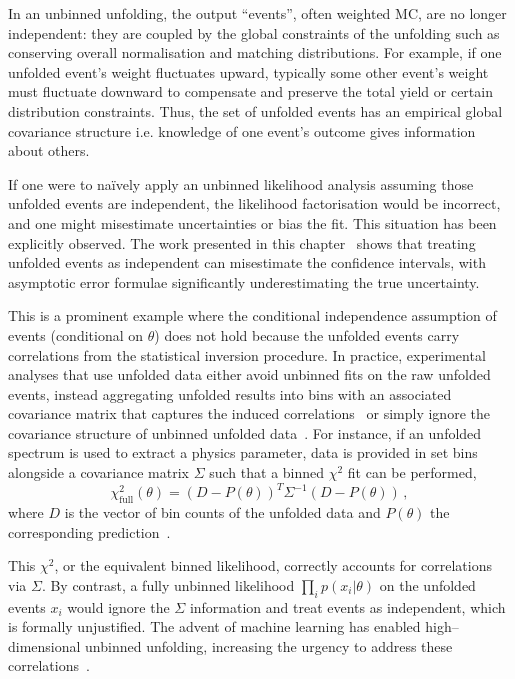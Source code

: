         In an unbinned unfolding, the output ``events'', often weighted MC, are no longer independent: they are coupled by the global constraints of the unfolding such as conserving overall normalisation and matching distributions.
        For example, if one unfolded event’s weight fluctuates upward, typically some other event’s weight must fluctuate downward to compensate and preserve the total yield or certain distribution constraints.
        Thus, the set of unfolded events has an empirical global covariance structure i.e. knowledge of one event's outcome gives information about others.
        
        If one were to naïvely apply an unbinned likelihood analysis assuming those unfolded events are independent, the likelihood factorisation would be incorrect, and one might misestimate uncertainties or bias the fit.
        This situation has been explicitly observed.
        The work presented in this chapter~\cite{Desai:2025mpy} shows that treating unfolded events as independent can misestimate the confidence intervals, with asymptotic error formulae significantly underestimating the true uncertainty.
        
        This is a prominent example where the conditional independence assumption of events (conditional on $\theta$) does not hold because the unfolded events carry correlations from the statistical inversion procedure.
        In practice, experimental analyses that use unfolded data either avoid unbinned fits on the raw unfolded events, instead aggregating unfolded results into bins with an associated covariance matrix that captures the induced correlations~\cite{Huang2025MachineTechnique} or simply ignore the covariance structure of unbinned unfolded data~\cite{Canelli:2025ybb, Arratia:2021otl}.
        For instance, if an unfolded spectrum is used to extract a physics parameter, data is provided in set bins alongside a covariance matrix $\Sigma$ such that a binned $\chi^2$ fit can be performed,
          \[
            \label{eq:chi2cov}
            \chi^2_{\text{full}}(\theta) = (D - P(\theta))^T \Sigma^{-1} (D - P(\theta))\,,
          \] 
        where $D$ is the vector of bin counts of the unfolded data and $P(\theta)$ the corresponding prediction~\cite{D0:2020ujb, CMS:2024onh, Gribanov:2022gri, Canonero:2024kzk}.
        
        This $\chi^2$, or the equivalent binned likelihood, correctly accounts for correlations via $\Sigma$.
        By contrast, a fully unbinned likelihood $\prod_i p(x_i|\theta)$ on the unfolded events $x_i$ would ignore the $\Sigma$ information and treat events as independent, which is formally unjustified.
        The advent of machine learning has enabled high--dimensional unbinned unfolding, increasing the urgency to address these correlations~\cite{Andreassen:2021zzk, Canelli:2025ybb, Favaro:2025psi}.
        
